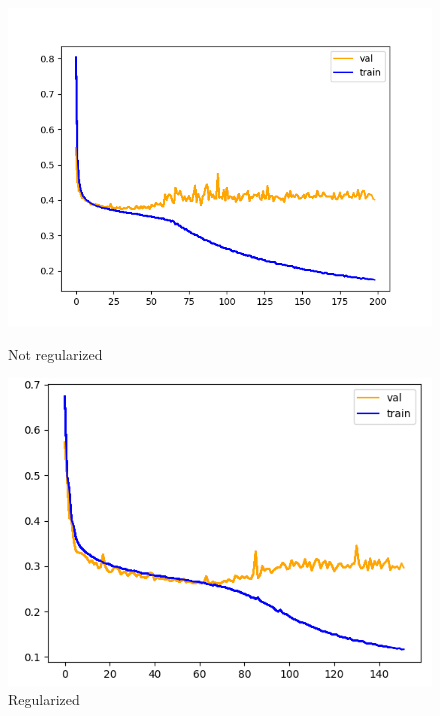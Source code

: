 \begin{figure}[htb]
    \centering
    \begin{minipage}{.5\textwidth}
      \centering
      \includegraphics[width=\linewidth]{bilder/firt-train-overfit.png}
      \caption{Not regularized}
      \label{fig:first-train-overfit}
    \end{minipage}%
    \begin{minipage}{.5\textwidth}
      \centering
      \includegraphics[width=\linewidth]{bilder/first-train-regularized.png}
      \caption{Regularized}
      \label{fig:first-train-regularized}
    \end{minipage}
\end{figure}